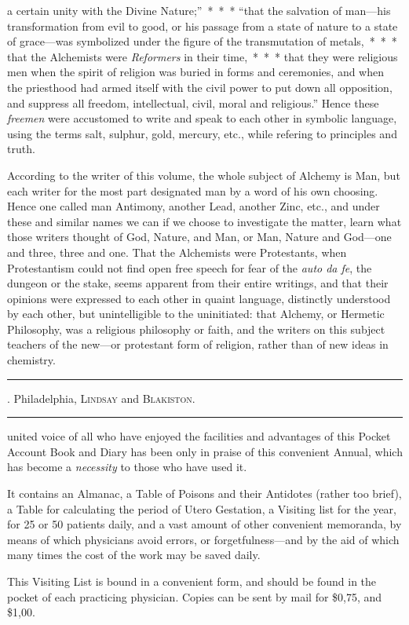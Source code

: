 a certain unity with the Divine Nature;''~*~*~* ``that the salvation
of man---his transformation from evil to good, or his passage from
a state of nature to a state of grace---was symbolized under the figure
of the transmutation of metals,~*~*~* that the Alchemists were
\emph{Reformers} in their time,~*~*~* that they were religious men when
the spirit of religion was buried in forms and ceremonies, and when
the priesthood had armed itself with the civil power to put down all
opposition, and suppress all freedom, intellectual, civil, moral and religious.''
Hence these \emph{freemen} were accustomed to write and speak
to each other in symbolic language, using the terms salt, sulphur, gold,
mercury, etc., while refering to principles and truth.

According to the writer of this volume, the whole subject of Alchemy
is Man, but each writer for the most part designated man by a word of
his own choosing. Hence one called man Antimony, another Lead,
another Zinc, etc., and under these and similar names we can if we
choose to investigate the matter, learn what those writers thought of
God, Nature, and Man, or Man, Nature and God---one and three, three
and one. That the Alchemists were Protestants, when Protestantism
could not find open free speech for fear of the \emph{auto da fe}, the dungeon
or the stake, seems apparent from their entire writings, and that their
opinions were expressed to each other in quaint language, distinctly
understood by each other, but unintelligible to the uninitiated: that
Alchemy, or Hermetic Philosophy, was a religious philosophy or faith,
and the writers on this subject teachers of the new---or protestant form
of religion, rather than of new ideas in chemistry.

\fancybreak{* * *}

\footnotesize
{}. Philadelphia,
\textsc{Lindsay} and \textsc{Blakiston}.
\plainbreak{1}
\normalsize


 united voice of all who have enjoyed the facilities and advantages
of this Pocket Account Book and Diary has been only in praise
of this convenient Annual, which has become a \emph{necessity} to those who
have used it.

It contains an Almanac, a Table of Poisons and their Antidotes
(rather too brief), a Table for calculating the period of Utero Gestation,
a Visiting list for the year, for 25 or 50 patients daily, and a vast
amount of other convenient memoranda, by means of which physicians
avoid errors, or forgetfulness---and by the aid of which many times
the cost of the work may be saved daily.

This Visiting List is bound in a convenient form, and should be found
in the pocket of each practicing physician. Copies can be sent by mail
for \$0,75, and \$1,00.\endinput
